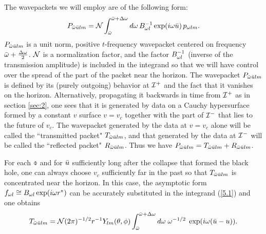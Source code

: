 The wavepackets we will employ are of the following form:
\begin{equation}
P_{\bar{\omega}\bar{u} lm}=
{\cal N}
\int_{\bar{\omega}}^{\bar{\omega}+\Delta\omega} d\omega
\, B_{\omega l}^{-1}
\exp(i\omega\bar{u})\, p_{\omega lm}.
\label{5.1}
\end{equation}
$P_{\bar{\omega}\bar{u} lm}$ is a unit norm, positive
$t$-frequency wavepacket centered on frequency $\bar{\omega}+{\Delta\omega\over2}$.
${\cal N}$ is a normalization factor, and
the factor $B_{\omega l}^{-1}$ (inverse of the transmission
amplitude) is included in the integrand so that we
will have control over the spread of the part of the packet
near the horizon. The wavepacket $P_{\bar{\omega}\bar{u} lm}$ is defined by
its (purely outgoing) behavior at ${\cal I}^+$
and the fact that it vanishes on
the horizon. Alternatively, propagating it backwards in time from
${\cal I}^+$ as in section \ref{sec:2},
one sees that it is generated by data on a Cauchy hypersurface formed
by a constant $v$ surface $v=v_c$ together with the part of
${\cal I}^-$ that lies to the future of $v_c$. The wavepacket
generated by the data at $v=v_c$ alone will be called the
``transmitted packet" $T_{\bar{\omega}\bar{u} lm}$, and that
generated by the data at ${\cal I}^-$ will be called the
``reflected packet" $R_{\bar{\omega}\bar{u} lm}$. Thus we have
$P_{\bar{\omega}\bar{u} lm}=
T_{\bar{\omega}\bar{u} lm}+R_{\bar{\omega}\bar{u} lm}$.

For each $\obar$ and for $\bar{u}$ sufficiently long after the
collapse that formed the black hole, one can always choose
$v_c$ sufficiently far in the past so that
$T_{\bar{\omega}\bar{u} lm}$ is concentrated near the horizon. In
this case, the asymptotic form
$f_{\omega l}\cong B_{\omega l}\exp(i\omega r^*)$
can be accurately substituted in the integrand
(\ref{5.1}) and one obtains
\begin{equation}
T_{\bar{\omega}\bar{u} lm}={\cal N}
(2\pi)^{-1/2} r^{-1}Y_{lm}(\theta,\phi)
\int_{\bar{\omega}}^{\bar{\omega}+\Delta\omega} d\omega \; \omega^{-1/2}\;
\exp(i\omega(\bar{u}-u)).
\label{5.11}
\end{equation}

